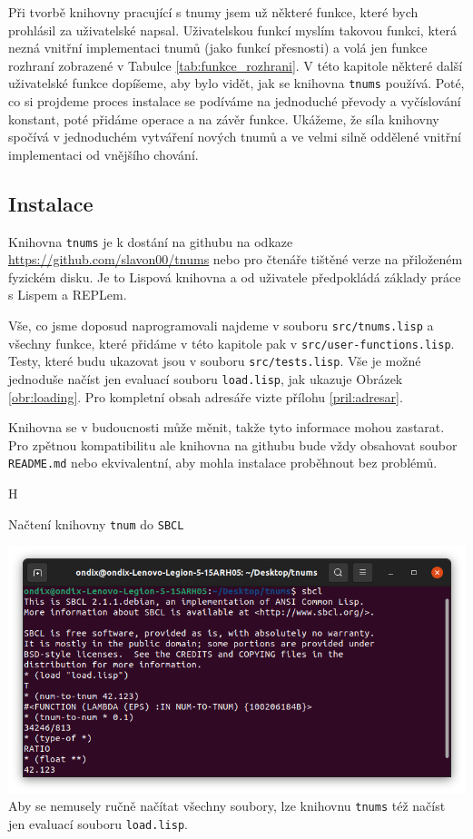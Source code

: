 Při tvorbě knihovny pracující s tnumy jsem už některé funkce, které bych prohlásil za uživatelské napsal. Uživatelskou funkcí myslím takovou funkci, která nezná vnitřní implementaci tnumů (jako funkcí přesnosti) a volá jen funkce rozhraní zobrazené v Tabulce \ref{tab:funkce_rozhrani}. V této kapitole některé další uživatelské funkce dopíšeme, aby bylo vidět, jak se knihovna \texttt{tnums} používá. Poté, co si projdeme proces instalace se podíváme na jednoduché převody a vyčíslování konstant, poté přidáme operace a na závěr funkce. Ukážeme, že síla knihovny spočívá v jednoduchém vytváření nových tnumů a ve velmi silně oddělené vnitřní implementaci od vnějšího chování.

\subsection{Instalace}
Knihovna \texttt{tnums} je k dostání na githubu na odkaze \url{https://github.com/slavon00/tnums} nebo pro čtenáře tištěné verze na přiloženém fyzickém disku. Je to Lispová knihovna a od uživatele předpokládá základy práce s Lispem a REPLem.

Vše, co jsme doposud naprogramovali najdeme v souboru \texttt{src/tnums.lisp} a všechny funkce, které přidáme v této kapitole pak v \texttt{src/user-functions.lisp}. Testy, které budu ukazovat jsou v souboru \texttt{src/tests.lisp}. Vše je možné jednoduše načíst jen evaluací souboru \texttt{load.lisp}, jak ukazuje Obrázek \ref{obr:loading}. Pro kompletní obsah adresáře vizte přílohu \ref{pril:adresar}.

Knihovna se v budoucnosti může měnit, takže tyto informace mohou zastarat. Pro zpětnou kompatibilitu ale knihovna na githubu bude vždy obsahovat soubor \texttt{README.md} nebo ekvivalentní, aby mohla instalace proběhnout bez problémů.

\begin{myfigure}{H}
\caption{Načtení knihovny \texttt{tnum} do \texttt{SBCL}}
\includegraphics[width=\linewidth]{./graphics/loading.png}\label{obr:loading}
Aby se nemusely ručně načítat všechny soubory, lze knihovnu \texttt{tnums} též načíst jen evaluací souboru \texttt{load.lisp}. 
\end{myfigure}

